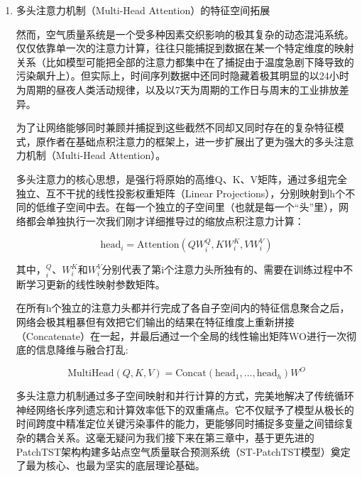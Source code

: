 \begin{enumerate}[label=（\arabic*）, leftmargin=0pt, itemindent=4.5em, labelsep=0.5em, listparindent=2em, parsep=0pt]
    最后，通过softmax函数将这些经过缩放的相似度得分强行归一化为一个总和为1的概率分布权重，然后再用这个权重矩阵去乘以真正包含历史浓度信息的值矩阵V。这样一个极其连贯的乘加过程，完美实现了一次跨越极长距离时间步的信息加权聚合。这种机制彻底打破了LSTM必须一步一步往后传递信息的枷锁，实现了在时间维度上的全局感受野和真正意义上的高度并行计算。

    \item 多头注意力机制（Multi-Head Attention）的特征空间拓展
    
    然而，空气质量系统是一个受多种因素交织影响的极其复杂的动态混沌系统。仅仅依靠单一次的注意力计算，往往只能捕捉到数据在某一个特定维度的映射关系（比如模型可能把全部的注意力都集中在了捕捉由于温度急剧下降导致的污染飙升上）。但实际上，时间序列数据中还同时隐藏着极其明显的以24小时为周期的昼夜人类活动规律，以及以7天为周期的工作日与周末的工业排放差异。

    为了让网络能够同时兼顾并捕捉到这些截然不同却又同时存在的复杂特征模式，原作者在基础点积注意力的框架上，进一步扩展出了更为强大的多头注意力机制（Multi-Head Attention）。

    多头注意力的核心思想，是强行将原始的高维Q、K、V矩阵，通过多组完全独立、互不干扰的线性投影权重矩阵（Linear Projections），分别映射到h个不同的低维子空间中去。在每一个独立的子空间里（也就是每一个“头”里），网络都会单独执行一次我们刚才详细推导过的缩放点积注意力计算：

    \begin{equation}\label{eq:MultiHead_Attention}
        \text{head}_i = \text{Attention}(QW_i^Q, KW_i^K, VW_i^V)
    \end{equation}

    其中，$_i^Q$、$W_i^K$和$W_i^V$分别代表了第i个注意力头所独有的、需要在训练过程中不断学习更新的线性映射参数矩阵。

    在所有h个独立的注意力头都并行完成了各自子空间内的特征信息聚合之后，网络会极其粗暴但有效把它们输出的结果在特征维度上重新拼接（Concatenate）在一起，并最后通过一个全局的线性输出矩阵WO进行一次彻底的信息降维与融合打乱:

    \begin{equation}\label{eq:MultiHead_Final}
        \text{MultiHead}(Q, K, V) = \text{Concat}(\text{head}_1, \ldots, \text{head}_h) W^O
    \end{equation}

    多头注意力机制通过多子空间映射和并行计算的方式，完美地解决了传统循环神经网络长序列遗忘和计算效率低下的双重痛点。它不仅赋予了模型从极长的时间跨度中精准定位关键污染事件的能力，更能够同时捕捉多变量之间错综复杂的耦合关系。这毫无疑问为我们接下来在第三章中，基于更先进的PatchTST架构构建多站点空气质量联合预测系统（ST-PatchTST模型）奠定了最为核心、也最为坚实的底层理论基础。

\end{enumerate}

